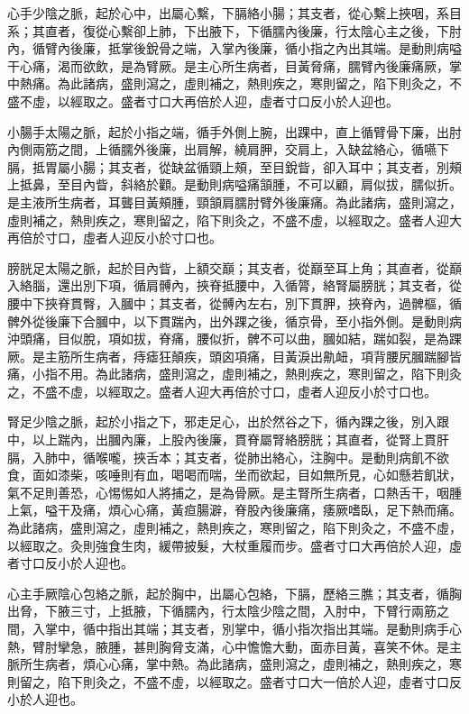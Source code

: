 心手少陰之脈，起於心中，出屬心繫，下膈絡小腸；其支者，從心繫上挾咽，系目系；其直者，復從心繫卻上肺，下出腋下，下循臑內後廉，行太陰心主之後，下肘內，循臂內後廉，抵掌後銳骨之端，入掌內後廉，循小指之內出其端。是動則病嗌干心痛，渴而欲飲，是為臂厥。是主心所生病者，目黃脅痛，臑臂內後廉痛厥，掌中熱痛。為此諸病，盛則瀉之，虛則補之，熱則疾之，寒則留之，陷下則灸之，不盛不虛，以經取之。盛者寸口大再倍於人迎，虛者寸口反小於人迎也。

小腸手太陽之脈，起於小指之端，循手外側上腕，出踝中，直上循臂骨下廉，出肘內側兩筋之間，上循臑外後廉，出肩解，繞肩胛，交肩上，入缺盆絡心，循嚥下膈，抵胃屬小腸；其支者，從缺盆循頸上頰，至目銳眥，卻入耳中；其支者，別頰上抵鼻，至目內眥，斜絡於顴。是動則病嗌痛頷腫，不可以顧，肩似拔，臑似折。是主液所生病者，耳聾目黃頰腫，頸頷肩臑肘臂外後廉痛。為此諸病，盛則瀉之，虛則補之，熱則疾之，寒則留之，陷下則灸之，不盛不虛，以經取之。盛者人迎大再倍於寸口，虛者人迎反小於寸口也。

膀胱足太陽之脈，起於目內眥，上額交巔；其支者，從巔至耳上角；其直者，從巔入絡腦，還出別下項，循肩髆內，挾脊抵腰中，入循膂，絡腎屬膀胱；其支者，從腰中下挾脊貫臀，入膕中；其支者，從髆內左右，別下貫胛，挾脊內，過髀樞，循髀外從後廉下合膕中，以下貫踹內，出外踝之後，循京骨，至小指外側。是動則病沖頭痛，目似脫，項如拔，脊痛，腰似折，髀不可以曲，膕如結，踹如裂，是為踝厥。是主筋所生病者，痔瘧狂顛疾，頭囟項痛，目黃淚出鼽衄，項背腰尻膕踹腳皆痛，小指不用。為此諸病，盛則瀉之，虛則補之，熱則疾之，寒則留之，陷下則灸之，不盛不虛，以經取之。盛者人迎大再倍於寸口，虛者人迎反小於寸口也。

腎足少陰之脈，起於小指之下，邪走足心，出於然谷之下，循內踝之後，別入跟中，以上踹內，出膕內廉，上股內後廉，貫脊屬腎絡膀胱；其直者，從腎上貫肝膈，入肺中，循喉嚨，挾舌本；其支者，從肺出絡心，注胸中。是動則病飢不欲食，面如漆柴，咳唾則有血，喝喝而喘，坐而欲起，目如無所見，心如懸若飢狀，氣不足則善恐，心惕惕如人將捕之，是為骨厥。是主腎所生病者，口熱舌干，咽腫上氣，嗌干及痛，煩心心痛，黃疸腸澼，脊股內後廉痛，痿厥嗜臥，足下熱而痛。為此諸病，盛則瀉之，虛則補之，熱則疾之，寒則留之，陷下則灸之，不盛不虛，以經取之。灸則強食生肉，緩帶披髮，大杖重履而步。盛者寸口大再倍於人迎，虛者寸口反小於人迎也。

心主手厥陰心包絡之脈，起於胸中，出屬心包絡，下膈，歷絡三膲；其支者，循胸出脅，下腋三寸，上抵腋，下循臑內，行太陰少陰之間，入肘中，下臂行兩筋之間，入掌中，循中指出其端；其支者，別掌中，循小指次指出其端。是動則病手心熱，臂肘攣急，腋腫，甚則胸脅支滿，心中憺憺大動，面赤目黃，喜笑不休。是主脈所生病者，煩心心痛，掌中熱。為此諸病，盛則瀉之，虛則補之，熱則疾之，寒則留之，陷下則灸之，不盛不虛，以經取之。盛者寸口大一倍於人迎，虛者寸口反小於人迎也。

